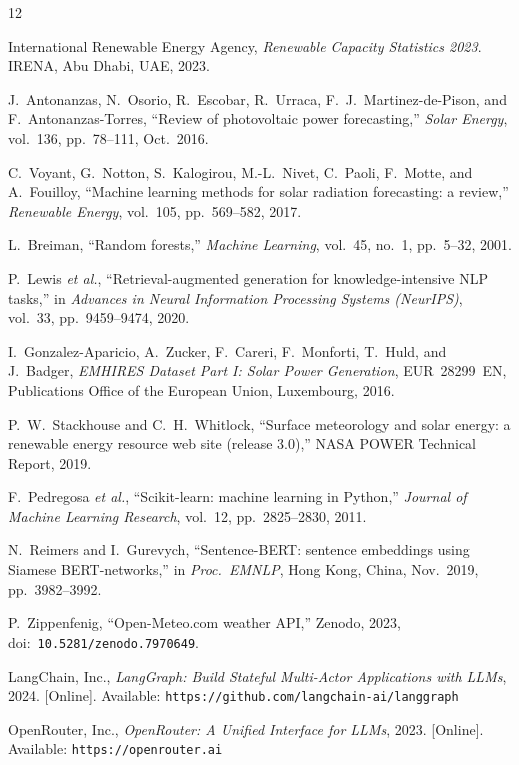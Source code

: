 \documentclass[11pt]{article}
\begin{document}
\begin{thebibliography}{12}

International Renewable Energy Agency,
\textit{Renewable Capacity Statistics 2023}.
IRENA, Abu Dhabi, UAE, 2023.

J.~Antonanzas, N.~Osorio, R.~Escobar, R.~Urraca, F.~J.~Martinez-de-Pison,
and F.~Antonanzas-Torres,
``Review of photovoltaic power forecasting,''
\textit{Solar Energy}, vol.~136, pp.~78--111, Oct.~2016.

C.~Voyant, G.~Notton, S.~Kalogirou, M.-L.~Nivet, C.~Paoli, F.~Motte,
and A.~Fouilloy,
``Machine learning methods for solar radiation forecasting: a review,''
\textit{Renewable Energy}, vol.~105, pp.~569--582, 2017.

L.~Breiman,
``Random forests,''
\textit{Machine Learning}, vol.~45, no.~1, pp.~5--32, 2001.

P.~Lewis \textit{et al.},
``Retrieval-augmented generation for knowledge-intensive NLP tasks,''
in \textit{Advances in Neural Information Processing Systems (NeurIPS)},
vol.~33, pp.~9459--9474, 2020.

I.~Gonzalez-Aparicio, A.~Zucker, F.~Careri, F.~Monforti, T.~Huld,
and J.~Badger,
\textit{EMHIRES Dataset Part I: Solar Power Generation},
EUR~28299~EN, Publications Office of the European Union, Luxembourg, 2016.

P.~W.~Stackhouse and C.~H.~Whitlock,
``Surface meteorology and solar energy: a renewable energy resource web site
(release 3.0),''
NASA POWER Technical Report, 2019.

F.~Pedregosa \textit{et al.},
``Scikit-learn: machine learning in Python,''
\textit{Journal of Machine Learning Research}, vol.~12, pp.~2825--2830, 2011.

N.~Reimers and I.~Gurevych,
``Sentence-BERT: sentence embeddings using Siamese BERT-networks,''
in \textit{Proc.\ EMNLP}, Hong Kong, China, Nov.~2019, pp.~3982--3992.

P.~Zippenfenig,
``Open-Meteo.com weather API,''
Zenodo, 2023,
doi:~\texttt{10.5281/zenodo.7970649}.

LangChain, Inc.,
\textit{LangGraph: Build Stateful Multi-Actor Applications with LLMs}, 2024.
[Online]. Available: \texttt{https://github.com/langchain-ai/langgraph}

OpenRouter, Inc.,
\textit{OpenRouter: A Unified Interface for LLMs}, 2023.
[Online]. Available: \texttt{https://openrouter.ai}

\end{thebibliography}
\end{document}
